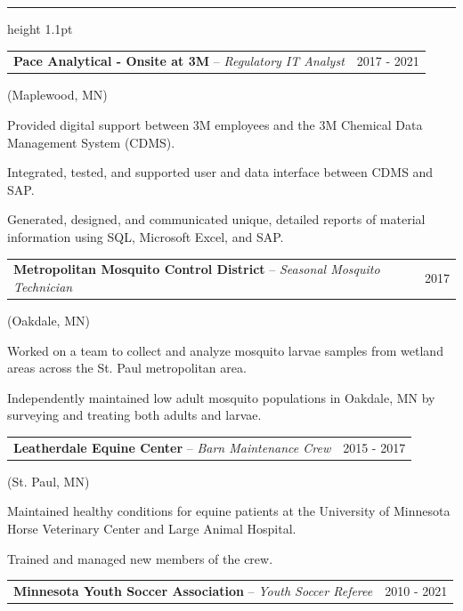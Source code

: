 \documentclass[10pt,letterpaper]{article}
\makeatletter
\newenvironment{cvbul}{\begin{list}{\textbullet}{\setlength{\leftmargin}{2.2em}\setlength{\labelwidth}{1em}\setlength{\labelsep}{0.6em}\setlength{\itemsep}{0pt}\setlength{\topsep}{1pt}\setlength{\parsep}{0pt}}}{\end{list}}
\newcommand{\cvsection}[1]{\par\vspace{11pt}{\large\bfseries\MakeUppercase{#1}}\par\vspace{1pt}\hrule height 1.1pt\vspace{6pt}\nopagebreak[4]}
\newcommand{\cvrow}[2]{\noindent\begin{tabularx}{\linewidth}{@{}X@{\hspace{1em}}r@{}}#1 & #2\end{tabularx}\par\vspace{-1pt}}
\makeatother
\begin{document}
\cvsection{Employment History}
\cvrow{\textbf{Pace Analytical - Onsite at 3M} -- \emph{Regulatory IT Analyst}}{2017 - 2021}
\noindent(Maplewood, MN)\par
\begin{cvbul}
\item Provided digital support between 3M employees and the 3M Chemical Data Management System (CDMS).
\item Integrated, tested, and supported user and data interface between CDMS and SAP.
\item Generated, designed, and communicated unique, detailed reports of material information using SQL, Microsoft Excel, and SAP.
\end{cvbul}
\vspace{4pt}
\cvrow{\textbf{Metropolitan Mosquito Control District} -- \emph{Seasonal Mosquito Technician}}{2017}
\noindent(Oakdale, MN)\par
\begin{cvbul}
\item Worked on a team to collect and analyze mosquito larvae samples from wetland areas across the St. Paul metropolitan area.
\item Independently maintained low adult mosquito populations in Oakdale, MN by surveying and treating both adults and larvae.
\end{cvbul}
\vspace{4pt}
\cvrow{\textbf{Leatherdale Equine Center} -- \emph{Barn Maintenance Crew}}{2015 - 2017}
\noindent(St. Paul, MN)\par
\begin{cvbul}
\item Maintained healthy conditions for equine patients at the University of Minnesota Horse Veterinary Center and Large Animal Hospital.
\item Trained and managed new members of the crew.
\end{cvbul}
\vspace{4pt}
\cvrow{\textbf{Minnesota Youth Soccer Association} -- \emph{Youth Soccer Referee}}{2010 - 2021}
\vspace{4pt}
\end{document}
